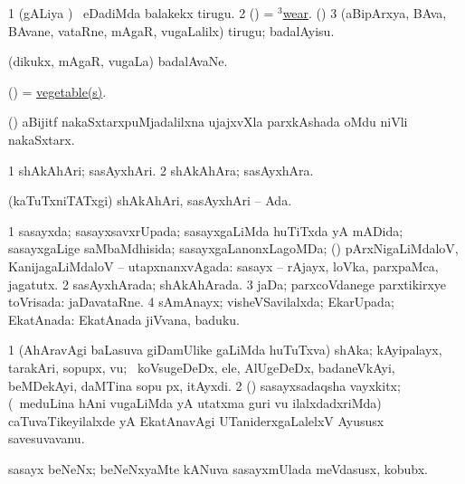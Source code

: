 \bentry
{} 
\gl{\akirx}
\expl{}
\bmng
\bnum
\num{1} (gALiya \vi) \kanmu\ eDadiMda balakekx tirugu. 
\num{2} (\nw) = \hyperref{kandict_w.pdf}{W}{wear(3)}{$^3$wear}. (\akirx) 
\num{3} (aBipArxya, BAva, BAvane, vataRne, mAgaR, \mo vugaLalilx) tirugu; badalAyisu. 
\enum
\emng
\eentry

\bentry
{} 
\gl{\nA}
\expl{}
\bmng
 (dikukx, mAgaR, \mo vugaLa) badalAvaNe. 
\emng
\eentry

\bentry
{} 
\gl{\nA}
\expl{}
\bmng
 (\AmA) = \hyperlink{vegetable(1)}{vegetable(s)}. 
\emng
\eentry

\bentry
{} 
\gl{\nA}
\expl{}
\bmng
 (\Kavi) aBijitf nakaSxtarxpuMjadalilxna ujajxvXla parxkAshada oMdu niVli nakaSxtarx. 
\emng
\eentry

\bentry
{} 
\gl{\nA}
\expl{}
\bmng
\bnum
\num{1} shAkAhAri; sasAyxhAri. 
\num{2} shAkAhAra; sasAyxhAra. 
\enum
\emng
\eentry

\bentry
{} 
\gl{\gu}
\expl{}
\bmng
 (kaTuTxniTATxgi) shAkAhAri, sasAyxhAri -- Ada. 
\emng
\eentry

\bentry
{} 
\gl{\gu}
\expl{}
\bmng
\bnum
\num{1} sasayxda; sasayxsavxrUpada; sasayxgaLiMda huTiTxda yA mADida; sasayxgaLige saMbaMdhisida; sasayxgaLanonxLagoMDa; (\kanmu) pArxNigaLiMdaloV, KanijagaLiMdaloV -- utapxnanxvAgada:  sasayx -- rAjayx, loVka, parxpaMca, jagatutx. 
\num{2} sasAyxhArada; shAkAhArada. 
\num{3} jaDa; parxcoVdanege parxtikirxye toVrisada:  jaDavataRne. 
\num{4} sAmAnayx; visheVSavilalxda; EkarUpada; EkatAnada:  EkatAnada jiVvana, baduku. 
\enum
\emng
\eentry

\bentry
{} 
\gl{\nA}
\expl{}
\bmng
\bnum
\num{1} (AhAravAgi baLasuva giDamUlike gaLiMda huTuTxva) shAka; kAyipalayx, tarakAri, sopupx, \mo vu; \udA\, koVsugeDeDx, ele, AlUgeDeDx, badaneVkAyi, beMDekAyi, daMTina sopu px, itAyxdi. 
\num{2} (\AmA) sasayxsadaqsha vayxkitx; (\kanmu\ meduLina hAni \mo vugaLiMda yA utatxma guri \mo vu ilalxdadxriMda) caTuvaTikeyilalxde yA EkatAnavAgi UTaniderxgaLalelxV Ayususx savesuvavanu. 
\enum
\emng
\eentry

\bentry
{}
\gl{\nA}
\expl{}
\bmng
 sasayx beNeNx; beNeNxyaMte kANuva sasayxmUlada meVdasusx, kobubx. 
\emng
\eentry

